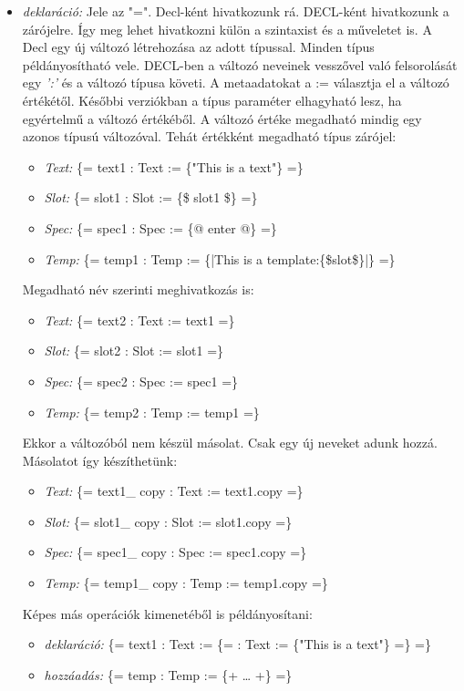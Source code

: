\begin{itemize}
\item \emph{deklaráció:} 
Jele az "=".
Decl-ként hivatkozunk rá.
DECL-ként hivatkozunk a zárójelre.
Így meg lehet hivatkozni külön a szintaxist és a műveletet is.
A Decl egy új változó létrehozása az adott típussal.
Minden típus példányosítható vele.
DECL-ben a változó neveinek vesszővel való felsorolását egy \textit{':'} és a változó típusa követi. 
A metaadatokat a := választja el a változó értékétől.
Későbbi verziókban a típus paraméter elhagyható lesz, ha egyértelmű a változó értékéből. 
A változó értéke megadható mindig egy azonos típusú változóval.
Tehát értékként megadható típus zárójel:
\begin{itemize}
\item\emph{Text:} \{= text1 : Text := \{"This is a text"\} =\}
\item\emph{Slot:} \{= slot1 : Slot := \{\$ slot1 \$\} =\}
\item\emph{Spec:} \{= spec1 : Spec := \{@ enter @\} =\}
\item\emph{Temp:} \{= temp1 : Temp := \{|This is a template:\{\$slot\$\}|\} =\}
\end{itemize}
Megadható név szerinti meghivatkozás is:
\begin{itemize}
\item\emph{Text:} \{= text2 : Text := text1 =\}
\item\emph{Slot:} \{= slot2 : Slot := slot1 =\}
\item\emph{Spec:} \{= spec2 : Spec := spec1 =\}
\item\emph{Temp:} \{= temp2 : Temp := temp1 =\}
\end{itemize}
Ekkor a változóból nem készül másolat.
Csak egy új neveket adunk hozzá.
Másolatot így készíthetünk:
\begin{itemize}
\item\emph{Text:} \{= text1\_ copy : Text := text1.copy =\}
\item\emph{Slot:} \{= slot1\_ copy : Slot := slot1.copy =\}
\item\emph{Spec:} \{= spec1\_ copy : Spec := spec1.copy =\}
\item\emph{Temp:} \{= temp1\_ copy : Temp := temp1.copy =\}
\end{itemize}
Képes más operációk kimenetéből is példányosítani:
\begin{itemize}
\item\emph{deklaráció:} \{= text1 : Text := \{= : Text := \{"This is a text"\} =\} =\}
\item\emph{hozzáadás:} \{= temp : Temp := \{+ … +\} =\}

\end{itemize}
\end{itemize}
